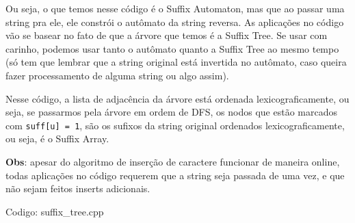 \documentclass[10pt, a4paper, oneside]{book}
\begin{document}
Ou seja, o que temos nesse código é o Suffix Automaton, mas que ao passar uma string pra ele, ele constrói o autômato da string reversa. As aplicações no código vão se basear no fato de que a árvore que temos é a Suffix Tree. Se usar com carinho, podemos usar tanto o autômato quanto a Suffix Tree ao mesmo tempo (só tem que lembrar que a string original está invertida no autômato, caso queira fazer processamento de alguma string ou algo assim).



Nesse código, a lista de adjacência da árvore está ordenada lexicograficamente, ou seja, se passarmos pela árvore em ordem de DFS, os nodos que estão marcados com \texttt{suff[u] = 1}, são os sufixos da string original ordenados lexicograficamente, ou seja, é o Suffix Array.



\textbf{Obs}: apesar do algoritmo de inserção de caractere funcionar de maneira online, todas aplicações no código requerem que a string seja passada de uma vez, e que não sejam feitos inserts adicionais.
\hfill

Codigo: suffix\_tree.cpp
\end{document}
